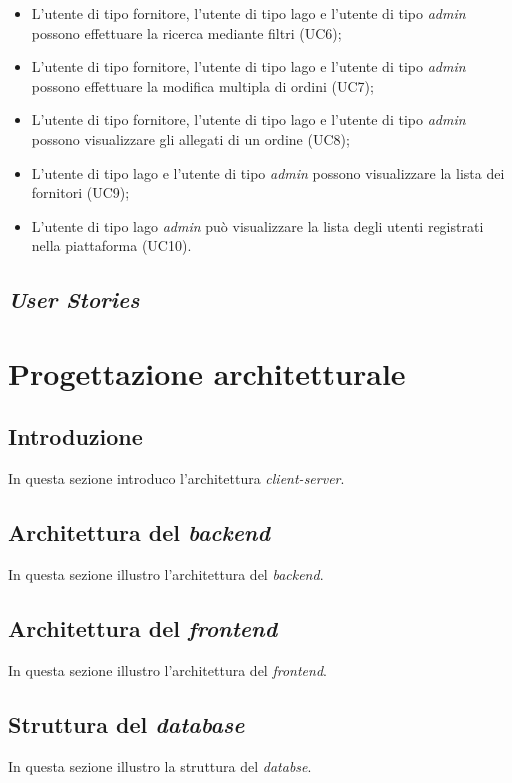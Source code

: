 \begin{itemize}
\begin{itemize}
      \item L'utente di tipo fornitore, l'utente di tipo lago e l'utente di tipo \emph{admin} possono effettuare la ricerca mediante filtri (UC6);
      \item L'utente di tipo fornitore, l'utente di tipo lago e l'utente di tipo \emph{admin} possono effettuare la modifica multipla di ordini (UC7);
      \item L'utente di tipo fornitore, l'utente di tipo lago e l'utente di tipo \emph{admin} possono visualizzare gli allegati di un ordine (UC8);
      \item L'utente di tipo lago e l'utente di tipo \emph{admin} possono visualizzare la lista dei fornitori (UC9);
      \item L'utente di tipo lago \emph{admin} può visualizzare la lista degli utenti registrati nella piattaforma (UC10).
    \end{itemize}
\end{itemize}

\subsection{\emph{User Stories}}


\section{Progettazione architetturale}

\subsection{Introduzione}
In questa sezione introduco l'architettura \emph{client-server}.

\subsection{Architettura del \emph{backend}}
In questa sezione illustro l'architettura del \emph{backend}.

\subsection{Architettura del \emph{frontend}}
In questa sezione illustro l'architettura del \emph{frontend}.

\subsection{Struttura del \emph{database}}
In questa sezione illustro la struttura del \emph{databse}.

